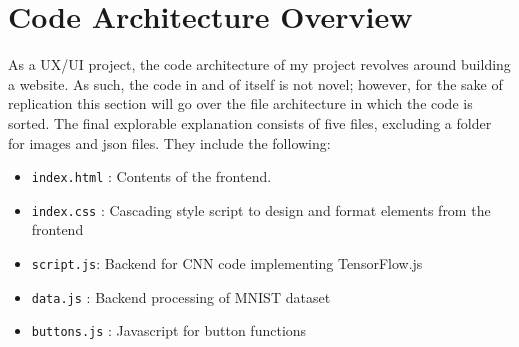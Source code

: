 \documentclass[10pt,twocolumn]{article}
\begin{document}
\section{Code Architecture Overview}
As a UX/UI project, the code architecture of my project revolves around building a website. As such, the code in and of itself is not novel; however, for the sake of replication this section will go over the file architecture in which the code is sorted. The final explorable explanation consists of five files, excluding a folder for images and json files. They include the following:
\begin{itemize}
    \item \verb|index.html| : Contents of the frontend.
    \item \verb|index.css| : Cascading style script to design and format elements from the frontend
    \item \verb|script.js|: Backend for CNN code implementing TensorFlow.js
    \item \verb|data.js| : Backend processing of MNIST dataset 
    \item \verb|buttons.js| : Javascript for button functions
\end{itemize}

\printbibliography
\end{document}
